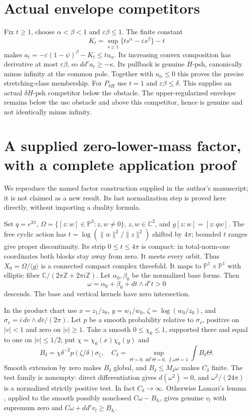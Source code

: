 \documentclass[11pt]{article}
\newcommand{\ddc}{dd^c}
\newcommand{\dc}{d^c}
\theoremstyle{remark}\newtheorem{remark}[theorem]{Remark}
\begin{document}
\section{Actual envelope competitors}
Fix $t\geq1$, choose $\alpha<\beta<1$ and $\varepsilon\beta\leq1$.
The finite constant
\[
 K_t=\sup_{s\geq1}\{ts^\alpha-\varepsilon s^\beta\}-t
\]
makes $a_t=-\varepsilon(1-\psi)^\beta-K_t\leq t u_\alpha$.
Its increasing convex composition has derivative at most
$\varepsilon\beta$, so $\ddc a_t\geq-\kappa$. Its pullback is genuine
$H$-psh, canonically minus infinity at the common pole. Together with
$u_\alpha\leq0$ this proves the precise stretching-class membership.
For $P_{\delta H}$ use $t=1$ and $\varepsilon\beta\leq\delta$.
This supplies an actual $\delta H$-psh competitor below the obstacle.
The upper-regularized envelope remains below the usc obstacle and above
this competitor, hence is genuine and not identically minus infinity.

\appendix
\section{A supplied zero-lower-mass factor, with a complete application proof}
We reproduce the named factor construction supplied in the author's
manuscript; it is not claimed as a new result. Its last normalization
step is proved here directly, without importing a duality formula.

Set $q=e^{2\pi}$, $\Omega=\{[z:w]\in\mathbb P^3:z,w\ne0\}$,
$z,w\in\mathbb C^2$, and $g[z:w]=[z:qw]$.
The free cyclic action has $t=\log(\|w\|^2/\|z\|^2)$ shifted by $4\pi$;
bounded $t$ ranges give proper discontinuity. Its strip $0\leq t\leq4\pi$
is compact: in total-norm-one coordinates both blocks stay away from zero.
It meets every orbit. Thus $X_0=\Omega/\langle g\rangle$ is a connected
compact complex threefold. It maps to $\mathbb P^1\times\mathbb P^1$
with elliptic fiber $\mathbb C/(2\pi\mathbb Z+2\pi i\mathbb Z)$.
Let $\alpha_0,\beta_0$ be the normalized base forms. Then
\[
 \omega=\alpha_0+\beta_0+dt\wedge\dc t>0
\]
descends. The base and vertical kernels have zero intersection.

In the product chart use $x=z_1/z_0$, $y=w_1/w_0$,
$\zeta=\log(w_0/z_0)$, and $\sigma_v=i\,dv\wedge d\bar v/(2\pi)$.
Let $p$ be a smooth probability relative to $\sigma_v$, positive on
$|v|<1$ and zero on $|v|\geq1$. Take a smooth $0\leq\chi_0\leq1$,
supported there and equal to one on $|v|\leq1/2$; put
$\chi=\chi_0(x)\chi_0(y)$ and
\[
 B_\delta=\chi\delta^{-2}p(\zeta/\delta)\sigma_\zeta,
 \quad C_\delta=\sup_{\Theta>0,\ \ddc\Theta=0,\ \int\omega\Theta=1}
                  \int B_\delta\Theta.
\]
Smooth extension by zero makes $B_\delta$ global, and $B_\delta\leq M_\delta\omega$
makes $C_\delta$ finite. The test family is nonempty: direct differentiation
gives $d(\omega^2)=0$, and $\omega^2/(24\pi)$ is a normalized strictly
positive test. In fact $C_\delta\to\infty$. Otherwise Lamari's
lemma \cite[Lemma 3.3]{Lamari}, applied to the smooth possibly nonclosed
$C\omega-B_{\delta_l}$, gives genuine $v_l$ with supremum zero and
$C\omega+\ddc v_l\geq B_{\delta_l}$.
\end{document}

